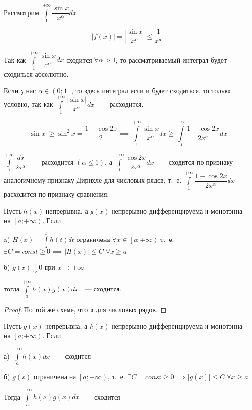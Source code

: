 \documentclass[../../main.tex]{subfiles}
\begin{document}
\begin{exmp}
 Рассмотрим $\displaystyle\int\limits_{1}^{+\infty} 
 \dfrac{\sin{x}}{x^{\alpha}}dx$
 
 \[\left| f(x) \right| = \left| \dfrac{\sin{x}}{x^{\alpha}}\right| \leq 
 \dfrac{1}{x^{\alpha}}\]
 
 Так как $\displaystyle\int\limits_{1}^{+\infty} 
 \dfrac{\sin{x}}{x^{\alpha}}dx$ сходится $\forall \alpha  > 1$, то 
 рассматриваемый интеграл будет сходиться абсолютно.
 
 Если у нас $\alpha \in \left(0; 1 \right]$, то здесь интеграл если и будет 
 сходиться, то только условно, так как 
 $\displaystyle\int\limits_{1}^{+\infty}\dfrac{\left| 
 \sin{x}\right|}{x^{\alpha}}dx$ ~--- расходится.
 
 \[\left| \sin{x} \right| \geq \sin^2{x} = \dfrac{1-\cos{2x}}{2} \implies 
 \int\limits_{1}^{+\infty} \dfrac{\sin{x}}{x^{\alpha}}dx \geq 
 \int\limits_{1}^{+\infty} \dfrac{1 - \cos{2x}}{2x^{\alpha}}dx\]
 
 $\displaystyle\int\limits_{1}^{+\infty} \dfrac{dx}{2x^{\alpha}}$ ~--- 
 расходится $(\alpha \leq 1)$, а $\displaystyle\int\limits_{1}^{+\infty} 
 \dfrac{\cos{2x}}{2x^{\alpha}}dx$ ~--- сходится по признаку аналогичному 
 признаку Дирихле для числовых рядов, т.~е. 
 $\displaystyle\int\limits_{1}^{+\infty} \dfrac{1 - \cos{2x}}{2x^{\alpha}}dx$ 
 ~--- расходится по признаку сравнения. 
\end{exmp}

\begin{theorem}
 Пусть $h(x)$ непрерывна, а $g(x)$ непрерывно дифференцируема и монотонна на 
 $\left[a; +\infty\right)$.
Если

a) $H(x) = \displaystyle\int\limits_{a}^{x}h(t)dt$ ограничена $\forall x \in 
\left[a; +\infty \right)$ т.~е. $\exists C = const \geq 0 \implies \left| H(x) 
\right| \leq C \; \forall x \geq a$

б) $g(x) \downarrow 0$ при $x \to +\infty$

тогда $\displaystyle\int\limits_{a}^{+\infty}h(x)g(x)dx$ ~--- сходится.

\end{theorem}
\begin{proof}
 По той же схеме, что и для числовых рядов.
\end{proof}

\begin{thm}
Пусть $g(x)$ непрерывна, а $h(x)$ непрерывно дифференцируема и монотонна на 
$\left[a; +\infty \right)$. Если

а) $\displaystyle\int\limits_{a}^{+\infty}h(x)dx$ ~--- сходится

б) $g(x)$ ограничена на $\left[a; +\infty\right)$, т.~е. $\exists C = 
const\geq 0 \implies \left| g(x) \right| \leq C \; \forall x \geq a$

Тогда $\displaystyle\int\limits_{a}^{+\infty} h(x)g(x)dx$ ~--- сходится
\end{thm}
\end{document}
